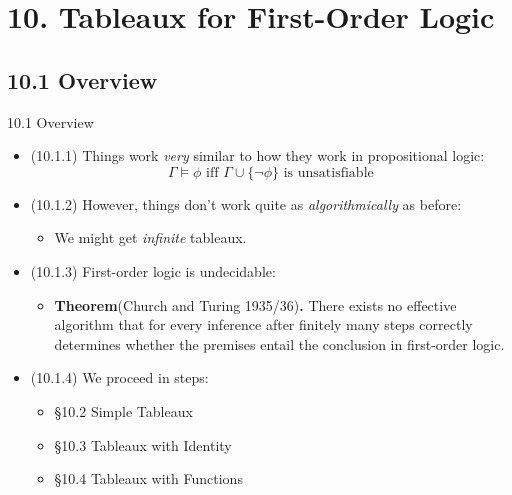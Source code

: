 \documentclass[../slides.tex]{subfiles}
\begin{document}
\section{10. Tableaux for First-Order Logic}
\subsection{10.1 Overview}

\begin{frame}{10.1 Overview}

	\begin{itemize}
		
		\item (10.1.1) Things work \emph{very} similar to how they work in propositional logic:
		\[\Gamma\vDash\phi\text{ iff }\Gamma\cup\{\neg\phi\}\text{ is unsatisfiable}\]

		\item (10.1.2) However, things don't work quite as \emph{algorithmically} as before:
		\begin{itemize}
			
			\item We might get \emph{infinite} tableaux.
		
		\end{itemize}

		\item (10.1.3) First-order logic is undecidable: 
				
		\begin{itemize}
		
			\item \textbf{Theorem}(Church and Turing 1935/36)\textbf{.} There exists no effective algorithm that for every inference after finitely many steps correctly determines whether the premises entail the conclusion in first-order logic.
			
		\end{itemize}
		
		\item (10.1.4) We proceed in steps:
		
			\begin{itemize}
			
				\item \S10.2 Simple Tableaux
				
				\item \S10.3 Tableaux with Identity
				
				\item \S10.4 Tableaux with Functions
			
			\end{itemize}

	\end{itemize}

\end{frame}
\end{document}
